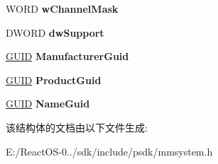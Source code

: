 \begin{DoxyCompactItemize}
W\+O\+RD {\bfseries w\+Channel\+Mask}
\item 
\mbox{\label{structtag_m_i_d_i_o_u_t_c_a_p_s2_w_a6c898cbfb6b71b4f25a60d0939a33a65}} 
D\+W\+O\+RD {\bfseries dw\+Support}
\item 
\mbox{\label{structtag_m_i_d_i_o_u_t_c_a_p_s2_w_afa70a5e99e5c73aa0f98bac5fc387a2f}} 
\hyperlink{interface_g_u_i_d}{G\+U\+ID} {\bfseries Manufacturer\+Guid}
\item 
\mbox{\label{structtag_m_i_d_i_o_u_t_c_a_p_s2_w_a68a559f955a07bc1b32f6d0681537cb0}} 
\hyperlink{interface_g_u_i_d}{G\+U\+ID} {\bfseries Product\+Guid}
\item 
\mbox{\label{structtag_m_i_d_i_o_u_t_c_a_p_s2_w_a9a63c7a3bad04d53a25abad8225adeb2}} 
\hyperlink{interface_g_u_i_d}{G\+U\+ID} {\bfseries Name\+Guid}
\end{DoxyCompactItemize}


该结构体的文档由以下文件生成\+:\begin{DoxyCompactItemize}
\item 
E\+:/\+React\+O\+S-\/0../sdk/include/psdk/mmsystem.\+h\end{DoxyCompactItemize}
